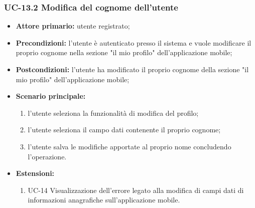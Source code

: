 \subsubsection{UC-13.2 Modifica del cognome dell'utente}
\begin{itemize}
	\item \textbf{Attore primario:} utente registrato;

	\item \textbf{Precondizioni:} l'utente è autenticato presso il sistema e vuole modificare il proprio cognome nella sezione "il mio profilo" dell'applicazione mobile;

	\item \textbf{Postcondizioni:} l'utente ha modificato il proprio cognome della sezione "il mio profilo" dell'applicazione mobile;

	\item \textbf{Scenario principale:}
	
		\begin{enumerate}
    		\item l'utente seleziona la funzionalità di modifica del profilo;
    		\item l'utente seleziona il campo dati contenente il proprio cognome;
    		\item l'utente salva le modifiche apportate al proprio nome concludendo l'operazione.
		\end{enumerate}
		
	\item \textbf{Estensioni:} 
	\begin{enumerate}
    	\item UC-14 Visualizzazione dell'errore legato alla modifica di campi dati di informazioni anagrafiche sull'applicazione mobile.
	\end{enumerate}
\end{itemize}


